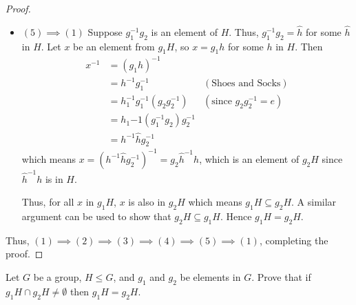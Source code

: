 \begin{proof}
\begin{itemize}
        \item $\boxed{(5) \implies (1)}$
        Suppose $g_1^{-1}g_2$ is an element of $H$. Thus, $g_1^{-1}g_2 = \hat{h}$ for some $\hat{h}$ in $H$. Let $x$ be an element from $g_1H$, so $x = g_1h$ for some $h$ in $H$. Then
        \begin{align*}
            x^{-1} &= (g_1h)^{-1}\\
            &= h^{-1}g_1^{-1} & (\text{Shoes and Socks})\\
            &= h_1^{-1}g_1^{-1}(g_2g_2^{-1}) & (\text{since }g_2g_2^{-1} = e)\\
            &= h_1{-1}(g_1^{-1}g_2)g_2^{-1}\\
            &= h^{-1}\hat{h}g_2^{-1}
        \end{align*}
        which means $x = \left(h^{-1}\hat{h}g_2^{-1}\right)^{-1} = g_2\hat{h}^{-1}h$, which is an element of $g_2H$ since $\hat{h}^{-1}h$ is in $H$.

        Thus, for all $x$ in $g_1H$, $x$ is also in $g_2H$ which means $g_1H \subseteq g_2H$. A similar argument can be used to show that $g_2H \subseteq g_1H$. Hence $g_1H = g_2H$.
    \end{itemize}

    Thus, $(1) \implies (2) \implies (3) \implies (4) \implies (5) \implies (1)$, completing the proof.
\end{proof}

\begin{exercise}\label{exercise-intersection-of-distinct-cosets-is-empty}
    Let $G$ be a group, $H \leq G$, and $g_1$ and $g_2$ be elements in $G$. Prove that if $g_1H \cap g_2H \neq \emptyset$ then $g_1H = g_2H$.
\end{exercise}


